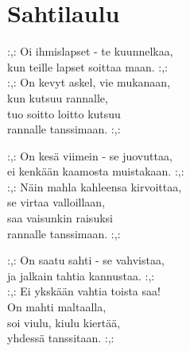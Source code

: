 \section{Sahtilaulu}
:,: Oi ihmislapset - te kuunnelkaa,\\
kun teille lapset soittaa maan. :,:\\
:,: On kevyt askel, vie mukanaan,\\
kun kutsuu rannalle,\\
tuo soitto loitto kutsuu \\
rannalle tanssimaan. :,:

:,: On kesä viimein - se juovuttaa,\\
ei kenkään kaamosta muistakaan. :,:\\
:,: Näin mahla kahleensa kirvoittaa,\\
se virtaa valloillaan,\\
saa vaisunkin raisuksi \\
rannalle tanssimaan. :,:

:,: On saatu sahti - se vahvistaa,\\
ja jalkain tahtia kannustaa. :,:\\
:,: Ei ykskään vahtia toista saa!\\
On mahti maltaalla,\\
soi viulu, kiulu kiertää, \\
yhdessä tanssitaan. :,:
